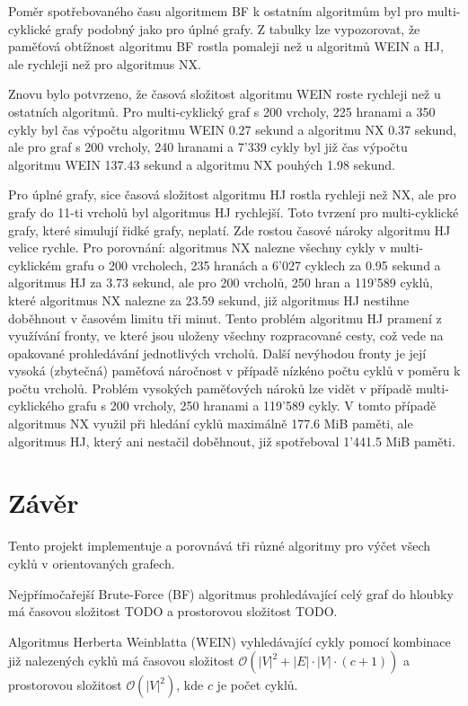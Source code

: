         Poměr spotřebovaného času algoritmem BF k ostatním algoritmům byl pro multi-cyklické grafy podobný jako pro úplné grafy. Z tabulky lze vypozorovat, že paměťová obtížnost algoritmu BF rostla pomaleji než u algoritmů WEIN a HJ, ale rychleji než pro algoritmus NX.

        Znovu bylo potvrzeno, že časová složitost algoritmu WEIN roste rychleji než u ostatních algoritmů. Pro multi-cyklický graf s 200 vrcholy, 225 hranami a 350 cykly byl čas výpočtu algoritmu WEIN 0.27 sekund a algoritmu NX 0.37 sekund, ale pro graf s 200 vrcholy, 240 hranami a 7'339 cykly byl již čas výpočtu algoritmu WEIN 137.43 sekund a algoritmu NX pouhých 1.98 sekund.

        Pro úplné grafy, sice časová složitost algoritmu HJ rostla rychleji než NX, ale pro grafy do 11-ti vrcholů byl algoritmus HJ rychlejší. Toto tvrzení pro multi-cyklické grafy, které simulují řidké grafy, neplatí. Zde rostou časové nároky algoritmu HJ velice rychle. Pro porovnání: algoritmus NX nalezne všechny cykly v multi-cyklickém grafu o 200 vrcholech, 235 hranách a 6'027 cyklech za 0.95 sekund a algoritmus HJ za 3.73 sekund, ale pro 200 vrcholů, 250 hran a 119'589 cyklů, které algoritmus NX nalezne za 23.59 sekund, již algoritmus HJ nestihne doběhnout v časovém limitu tři minut. Tento problém algoritmu HJ pramení z využívání fronty, ve které jsou uloženy všechny rozpracované cesty, což vede na opakované prohledávání jednotlivých vrcholů. Další nevýhodou fronty je její vysoká (zbytečná) paměťová náročnost v případě nízkéno počtu cyklů v poměru k počtu vrcholů. Problém vysokých paměťových nároků lze vidět v případě multi-cyklického grafu s 200 vrcholy, 250 hranami a 119'589 cykly. V tomto případě algoritmus NX využil při hledání cyklů maximálně 177.6 MiB paměti, ale algoritmus HJ, který ani nestačil doběhnout, již spotřeboval 1'441.5 MiB paměti.

\chapter{Závěr}
    \label{chapter:Conclusion}
    Tento projekt implementuje a porovnává tři různé algoritmy pro výčet všech cyklů v orientovaných grafech.

    Nejpřímočařejší Brute-Force (BF) algoritmus prohledávající celý graf do hloubky má časovou složitost TODO a prostorovou složitost TODO.

    Algoritmus Herberta Weinblatta (WEIN) vyhledávající cykly pomocí kombinace již nalezených cyklů má časovou složitost $\mathcal{O}(|V|^2+|E|\cdot|V|\cdot(c + 1))$ a prostorovou složitost $\mathcal{O}(|V|^2)$, kde $c$ je počet cyklů.

